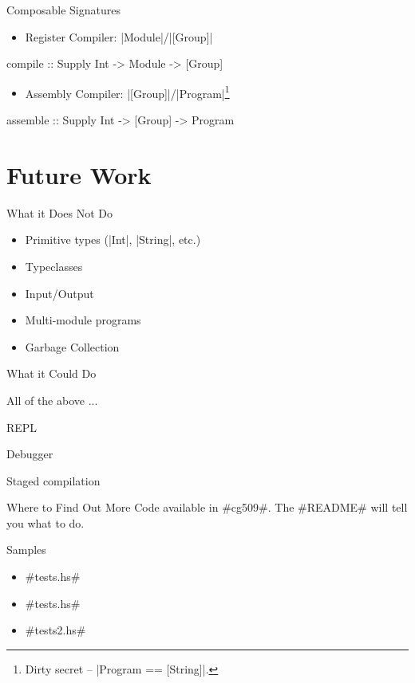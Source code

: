 \documentclass{beamer}
\begin{document}
\begin{frame}[fragile]{Composable Signatures}
  \begin{itemize}
  \item Register Compiler: |Module|/|[Group]|
  \end{itemize}
  
  \begin{code}
   compile :: Supply Int -> Module -> [Group]
  \end{code}
  
\begin{itemize}
  \item Assembly Compiler: |[Group]|/|Program|\footnote[frame]{Dirty secret -- |Program == [String]|.}
  \end{itemize}

  \begin{code}
   assemble :: Supply Int -> [Group] -> Program
 \end{code}

\end{frame}

\section{Future Work}
\begin{frame}{What it Does Not Do}
  \begin{itemize}
  \item Primitive types (|Int|, |String|, etc.)
  \item Typeclasses
  \item Input/Output
  \item Multi-module programs
  \item Garbage Collection
  \end{itemize}
\end{frame}

\begin{frame}{What it Could Do}
  \item All of the above ...
  \item REPL
  \item Debugger
  \item Staged compilation 
\end{frame}

\begin{frame}[fragile]{Where to Find Out More}
  Code available in #cg509#. The #README# will tell you what to do.
\end{frame}

\begin{frame}[fragile]{Samples}
  \begin{itemize}
  \item #tests\Even.hs#
  \item #tests\Fib.hs# 
  \item #tests\Foldr2.hs# 
  \end{itemize}
\end{frame}
\end{document}
